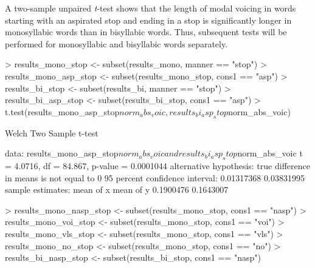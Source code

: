 \documentclass{article}
\begin{document}
A two-sample unpaired \textit{t}-test shows that the length of modal voicing in words starting with an aspirated stop and ending in a stop is significantly longer in monosyllabic words than in bisyllabic words. Thus, subsequent tests will be performed for monosyllabic and bisyllabic words separately.

\begin{Schunk}
\begin{Sinput}
> results_mono_stop <- subset(results_mono, manner == "stop")
> results_mono_asp_stop <- subset(results_mono_stop, cons1 == "asp")
> results_bi_stop <- subset(results_bi, manner == "stop")
> results_bi_asp_stop <- subset(results_bi_stop, cons1 == "asp")
> t.test(results_mono_asp_stop$norm_abs_voic, results_bi_asp_stop$norm_abs_voic)
\end{Sinput}
\begin{Soutput}
	Welch Two Sample t-test

data:  results_mono_asp_stop$norm_abs_voic and results_bi_asp_stop$norm_abs_voic
t = 4.0716, df = 84.867, p-value = 0.0001044
alternative hypothesis: true difference in means is not equal to 0
95 percent confidence interval:
 0.01317368 0.03831995
sample estimates:
mean of x mean of y 
0.1900476 0.1643007 
\end{Soutput}
\end{Schunk}

\begin{Schunk}
\begin{Sinput}
> results_mono_nasp_stop <- subset(results_mono_stop, cons1 == "nasp")
> results_mono_voi_stop <- subset(results_mono_stop, cons1 == "voi")
> results_mono_vls_stop <- subset(results_mono_stop, cons1 == "vls")
> results_mono_no_stop <- subset(results_mono_stop, cons1 == "no")
> results_bi_nasp_stop <- subset(results_bi_stop, cons1 == "nasp")
\end{Sinput}
\end{Schunk}
\end{document}
